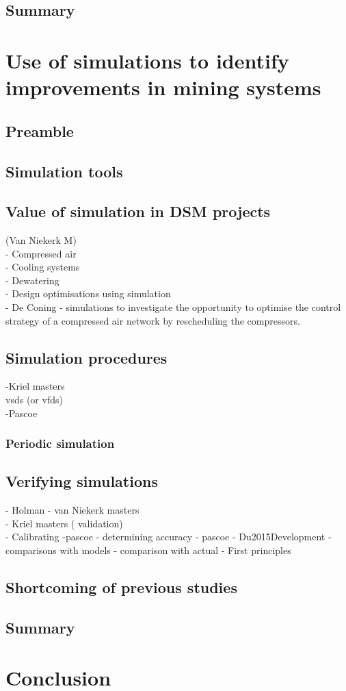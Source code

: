 	\subsection{Summary}
\clearpage	
\section{Use of simulations to identify improvements in mining systems}
	\subsection{Preamble}
	\subsection{Simulation tools}
	\subsection{Value of simulation in DSM projects}
		(Van Niekerk M)\\
		- Compressed air \\
		- Cooling systems\\
		- Dewatering\\
		- Design optimisations using simulation\\
		- De Coning -  simulations to investigate the opportunity to optimise the control strategy of a compressed air network by rescheduling the compressors.
	\subsection{Simulation procedures}
	
		-Kriel masters\\
		 \glspl{vsd} (or \glspl{vfd}) \\
		-Pascoe
		\subsubsection{Periodic simulation}
 	\subsection{Verifying simulations}
 		- Holman
 		- van Niekerk masters\\
 		- Kriel masters ( validation)\\
 		- Calibrating -pascoe
 		- determining accuracy - pascoe
 		- Du2015Development
 		- comparisons with models
 		- comparison with actual 
 		- First principles
 	\subsection{Shortcoming of previous studies}
 	\label{Shortcomings of previous work}
	\subsection{Summary}
\section{Conclusion}